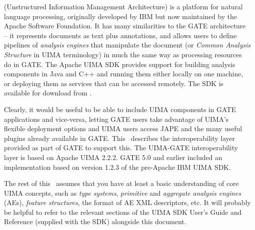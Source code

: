 %
%
%


\nnormalsize

 (Unstructured Information
Management Architecture) is a platform for natural language processing,
originally developed by IBM but now maintained by the Apache Software
Foundation.  It has many similarities to the GATE architecture -- it represents
documents as text plus annotations, and allows users to define pipelines of
\emph{analysis engines} that manipulate the document (or \emph{Common Analysis
Structure} in UIMA terminology) in much the same way as processing resources do
in GATE.  The Apache UIMA SDK provides support for building analysis components
in Java and C++ and running them either locally on one machine, or deploying
them as services that can be accessed remotely.  The SDK is available for
download from .

Clearly, it would be useful to be able to include UIMA components in GATE
applications and vice-versa, letting GATE users take advantage of UIMA's
flexible deployment options and UIMA users access JAPE and the many useful
plugins already available in GATE.  This \chapthing\ describes the
interoperability layer provided as part of GATE to support this.
The UIMA-GATE interoperability layer is based on Apache UIMA 2.2.2.  GATE 5.0
and earlier included an implementation based on version 1.2.3 of the pre-Apache
IBM UIMA SDK.

The rest of this \chapthing\ assumes that you have at least a basic
understanding of core UIMA concepts, such as \emph{type systems},
\emph{primitive} and \emph{aggregate analysis engines} (AEs),
\emph{feature structures}, the format of AE XML descriptors, etc.  It will
probably be helpful to refer to the relevant sections of the UIMA SDK User's
Guide and Reference (supplied with the SDK) alongside this document.


